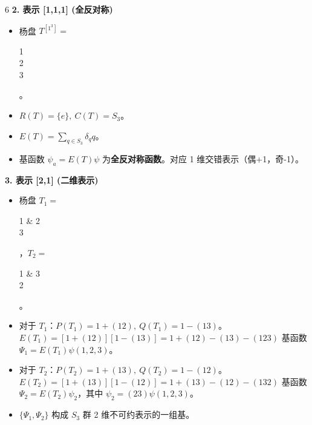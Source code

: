 \documentclass[landscape]{article}
\begin{document}
\begin{multicols*}{6}
\textbf{2. 表示 [1,1,1] (全反对称)}
\begin{itemize}
    \item 杨盘 $T^{[1^3]} =$ \tiny\begin{ytableau}1 \\ 2 \\ 3\end{ytableau}。
    \item $R(T) = \{e\},\ C(T) = S_3$。
    \item $E(T) = \sum_{q \in S_3} \delta_q q$。
    \item 基函数 $\psi_a = E(T)\psi$ 为\textbf{全反对称函数}。对应 1 维交错表示（偶+1，奇-1）。
\end{itemize}

\textbf{3. 表示 [2,1] (二维表示)}
\begin{itemize}
    \item 杨盘 $T_1 =$ \tiny\begin{ytableau}1 & 2 \\ 3\end{ytableau}，$T_2 =$ \tiny\begin{ytableau}1 & 3 \\ 2\end{ytableau}。
    \item 对于 $T_1$：$P(T_1)=1+(12),\ Q(T_1)=1-(13)$。
    \\ $ E(T_1) = [1+(12)][1-(13)] = 1+(12)-(13)-(123) $
    基函数 $\Psi_1 = E(T_1)\psi(1,2,3)$。
    \item 对于 $T_2$：$P(T_2)=1+(13),\ Q(T_2)=1-(12)$。
    \\ $ E(T_2) = [1+(13)][1-(12)] = 1+(13)-(12)-(132) $
    基函数 $\Psi_2 = E(T_2)\psi_2$，其中 $\psi_2=(23)\psi(1,2,3)$。
    \item $\{\Psi_1, \Psi_2\}$ 构成 $S_3$ 群 2 维不可约表示的一组基。
\end{itemize}

\end{multicols*}
\end{document}
